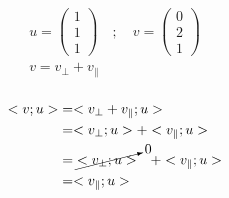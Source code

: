 \begin{equation}\begin{split}
	u = \begin{pmatrix*}1\\1\\1\end{pmatrix*}\quad;\quad
	v = \begin{pmatrix*}0\\2\\1\end{pmatrix*}\\
	v = v_{\bot} + v_{\parallel}\\\\
\end{split}\end{equation}
\begin{equation}\begin{split}
	<v; u>
	&= <v_{\bot} + v_{\parallel}; u>\\
	&= <v_{\bot}; u> + <v_{\parallel}; u>\\
	&= \cancelto{0}{<v_{\bot}; u>} \quad + <v_{\parallel}; u>\\
	&= <v_{\parallel}; u>\\
\end{split}\end{equation}
